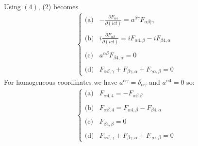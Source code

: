 Using $(4)$, (2) becomes
\begin{align}
\left\{\begin{array}{ll}
\text{(a)}&-\frac{\partial F_{\alpha4}}{\partial (ict)}= a^{\beta\gamma}F_{\alpha\beta|\gamma}\\\\
\text{(b)}&i\frac{\partial F_{\alpha\beta}}{\partial (ict)}= iF_{\alpha4,\beta}-iF_{\beta4,\alpha}\\\\
\text{(c)}&a^{\alpha\beta}F_{\beta4,\alpha}=0\\\\
\text{(d)}&F_{\alpha\beta,\gamma}+F_{\beta\gamma,\alpha}+F_{\gamma\alpha,\beta}=0
\end{array}\right.
\end{align}
For homogeneous coordinates we have $a^{\alpha\gamma}=\delta_{\alpha\gamma}$ and $a^{\alpha4}=0$ so:
\begin{align}
\left\{\begin{array}{ll}
\text{(a)}&F_{\alpha4,4}= -F_{\alpha\beta|\beta}\\\\
\text{(b)}& F_{\alpha\beta,4}= F_{\alpha4,\beta}-F_{\beta4,\alpha}\\\\
\text{(c)}&F_{\beta4,\beta}=0\\\\
\text{(d)}&F_{\alpha\beta,\gamma}+F_{\beta\gamma,\alpha}+F_{\gamma\alpha,\beta}=0
\end{array}\right.
\end{align}

